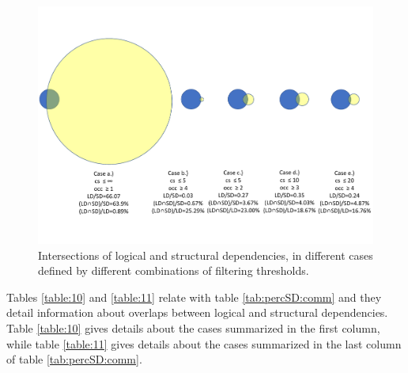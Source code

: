 \documentclass[a4paper,twoside]{article}
\begin{document}
\begin{figure}[!t]
\centering
\includegraphics[width=5.7in]{fig.pdf}
\vspace{-1cm}
\caption{Intersections of logical and structural dependencies, in different cases defined by different combinations of filtering thresholds. }
\label{fig_venn}
\end{figure}




Tables \ref{table:10} and \ref{table:11} relate with table \ref{tab:percSD:comm} and they detail information about overlaps between logical and structural dependencies. Table \ref{table:10} gives details about the cases summarized in the first column, while table \ref{table:11} gives details about the cases summarized in the last column of table \ref{tab:percSD:comm}.
  
\end{document}
